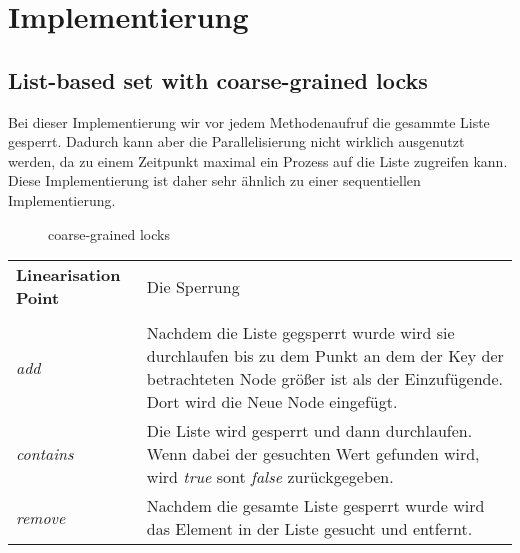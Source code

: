 \section{Implementierung}
\label{sec:implementation}
\subsection{List-based set with coarse-grained locks}

Bei dieser Implementierung wir vor jedem Methodenaufruf die gesammte Liste gesperrt. Dadurch kann aber die Parallelisierung nicht wirklich ausgenutzt werden, da zu einem Zeitpunkt maximal ein Prozess auf die Liste zugreifen kann. Diese Implementierung ist daher sehr ähnlich zu einer sequentiellen Implementierung.

\begin{figure}[H]
	\centering
	\caption{coarse-grained locks}
	\label{tik:coarse-grained}
\end{figure}

\begin{table}[H]
    \begin{tabularx}{\textwidth}{lX}
        \textbf{Linearisation Point} & Die Sperrung\\
        \\
        \textit{add} & Nachdem die Liste gegsperrt wurde wird sie durchlaufen bis zu dem Punkt an dem der Key der betrachteten Node größer ist als der Einzufügende. Dort wird die Neue Node eingefügt. \\
        \textit{contains} & Die Liste wird gesperrt und dann durchlaufen. Wenn dabei der gesuchten Wert gefunden wird, wird \textit{true} sont \textit{false} zurückgegeben.\\
        \textit{remove} & Nachdem die gesamte Liste gesperrt wurde wird das Element in der Liste gesucht und entfernt.\\
    \end{tabularx}
\end{table}

